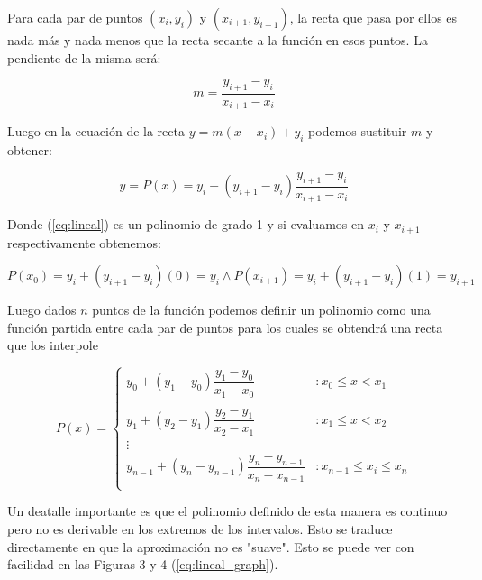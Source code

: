 \vspace{4mm}
Para cada par de puntos $(x_i, y_i)$ y $(x_{i+1}, y_{i+1})$, la recta que pasa por ellos es nada más y nada menos que la recta secante a la función en esos puntos. La pendiente de la misma será:

\begin{equation}
	 m = \dfrac{y_{i+1} - y_i}{x_{i+1} - x_i}
\end{equation}

Luego en la ecuación de la recta $y = m(x - x_i) + y_i$ podemos sustituir $m$ y 
obtener:

\begin{equation} \label{eq:lineal}
	 y = P(x) = y_i + (y_{i+1} - y_i)\dfrac{y_{i+1} - y_i}{x_{i+1} - x_i} 
\end{equation} 

Donde (\ref{eq:lineal}) es un polinomio de grado 1 y si evaluamos en $x_i$ y $x_{i+1}$ respectivamente obtenemos:

\begin{equation}
	 P(x_0) = y_i + (y_{i+1} - y_i)(0) = y_i \wedge P(x_{i+1}) = y_i + (y_{i+1} - y_i)(1) = y_{i+1} 
\end{equation}

Luego dados $n$ puntos de la función podemos definir un polinomio como una función partida entre cada par de puntos para los cuales se obtendrá una recta que los interpole

 \begin{displaymath}
   P(x) = \left\{
     \begin{array}{lr}
       y_0 + (y_1 - y_0)\dfrac{y_1 - y_0}{x_1 - x_0}  & : x_0 \leq x < x_1\\\\
       y_1 + (y_2 - y_1)\dfrac{y_2 - y_1}{x_2 - x_1}  & : x_1 \leq x < x_2\\
       \vdots\\
       y_{n-1} + (y_n - y_{n-1})\dfrac{y_n - y_{n-1}}{x_n - x_{n-1}}  & : x_{n-1}	\leq x_i \leq x_n\\
     \end{array}
   \right.
\end{displaymath} 

Un deatalle importante es que el polinomio definido de esta manera es continuo pero no es derivable en los extremos de los intervalos. Esto se traduce directamente en que la aproximación no es "suave". Esto se puede ver con facilidad en las Figuras 3 y 4 (\ref{eq:lineal_graph}).

